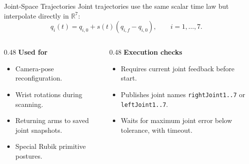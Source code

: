 \documentclass[10pt,aspectratio=169]{beamer}
\newcommand{\R}{\mathbb{R}}
\begin{document}
\begin{frame}{Joint-Space Trajectories}
  Joint trajectories use the same scalar time law but interpolate directly in $\R^7$:
  \[
    q_i(t) =
    q_{i,0} + s(t)\left(q_{i,f}-q_{i,0}\right),
    \qquad i=1,\ldots,7.
  \]

  \begin{columns}[T]
    \begin{column}{0.48\textwidth}
      \textbf{Used for}
      \begin{itemize}
        \item Camera-pose reconfiguration.
        \item Wrist rotations during scanning.
        \item Returning arms to saved joint snapshots.
        \item Special Rubik primitive postures.
      \end{itemize}
    \end{column}
    \begin{column}{0.48\textwidth}
      \textbf{Execution checks}
      \begin{itemize}
        \item Requires current joint feedback before start.
        \item Publishes joint names \texttt{rightJoint1..7} or \texttt{leftJoint1..7}.
        \item Waits for maximum joint error below tolerance, with timeout.
      \end{itemize}
    \end{column}
  \end{columns}
\end{frame}
\end{document}
